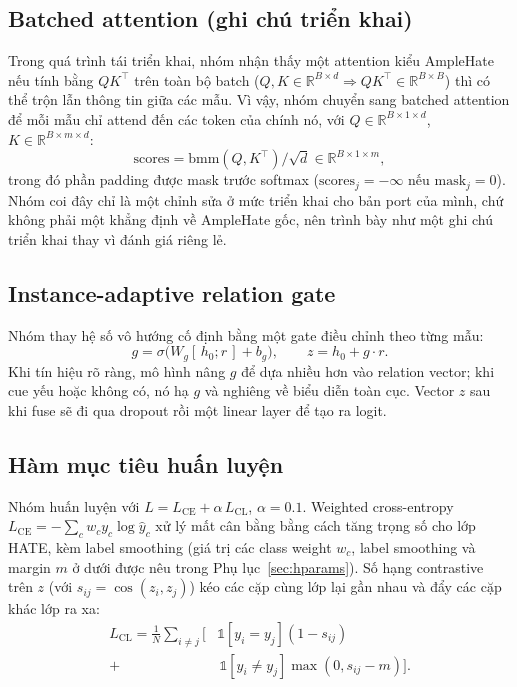 \documentclass[11pt]{article}
\begin{document}
\subsection{Batched attention (ghi chú triển khai)}
Trong quá trình tái triển khai, nhóm nhận thấy một attention kiểu AmpleHate nếu tính bằng $QK^\top$ trên toàn bộ batch ($Q,K\in\mathbb{R}^{B\times d}\Rightarrow QK^\top\in\mathbb{R}^{B\times B}$) thì có thể trộn lẫn thông tin giữa các mẫu. Vì vậy, nhóm chuyển sang batched attention để mỗi mẫu chỉ attend đến các token của chính nó, với $Q\in\mathbb{R}^{B\times 1\times d}$, $K\in\mathbb{R}^{B\times m\times d}$:
\begin{equation}
  \mathrm{scores} = \mathrm{bmm}(Q,K^\top)/\sqrt d \in\mathbb{R}^{B\times1\times m},
\end{equation}
trong đó phần padding được mask trước softmax ($\mathrm{scores}_j=-\infty$ nếu $\mathrm{mask}_j=0$). Nhóm coi đây chỉ là một chỉnh sửa ở mức triển khai cho bản port của mình, chứ không phải một khẳng định về AmpleHate gốc, nên trình bày như một ghi chú triển khai thay vì đánh giá riêng lẻ.

\subsection{Instance-adaptive relation gate}
Nhóm thay hệ số vô hướng cố định bằng một gate điều chỉnh theo từng mẫu:
\begin{equation}
  g = \sigma\big(W_g[\,h_0;r\,] + b_g\big),\qquad z = h_0 + g\cdot r.
\end{equation}
Khi tín hiệu rõ ràng, mô hình nâng $g$ để dựa nhiều hơn vào relation vector; khi cue yếu hoặc không có, nó hạ $g$ và nghiêng về biểu diễn toàn cục. Vector $z$ sau khi fuse sẽ đi qua dropout rồi một linear layer để tạo ra logit.

\subsection{Hàm mục tiêu huấn luyện}
Nhóm huấn luyện với $L = L_{\mathrm{CE}} + \alpha\,L_{\mathrm{CL}}$, $\alpha=0.1$. Weighted cross-entropy $L_{\mathrm{CE}}=-\sum_c w_c y_c\log\hat y_c$ xử lý mất cân bằng bằng cách tăng trọng số cho lớp HATE, kèm label smoothing (giá trị các class weight $w_c$, label smoothing và margin $m$ ở dưới được nêu trong Phụ lục~\ref{sec:hparams}). Số hạng contrastive trên $z$ (với $s_{ij}=\cos(z_i,z_j)$) kéo các cặp cùng lớp lại gần nhau và đẩy các cặp khác lớp ra xa:
\begin{equation}
\begin{split}
  L_{\mathrm{CL}} = \frac{1}{N}\sum_{i\neq j}\big[&\mathbb{1}[y_i{=}y_j](1-s_{ij}) \\[-2pt]
   + &\,\mathbb{1}[y_i{\neq}y_j]\max(0, s_{ij}-m)\big].
\end{split}
\end{equation}
\end{document}
